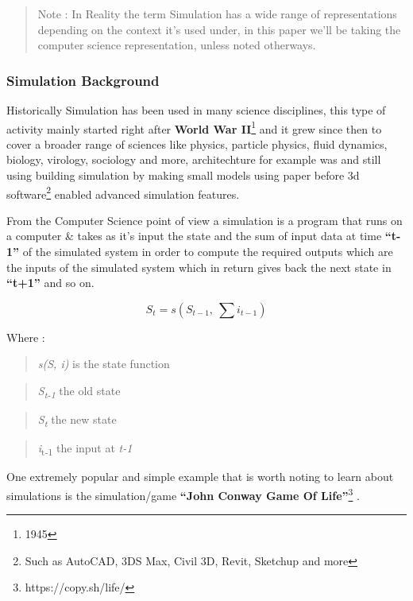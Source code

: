 \documentclass[
  14pt,
  english,
  a4paper,
]{scrreprt}
\begin{document}
\begin{quote}
Note : In Reality the term Simulation has a wide range of
representations depending on the context it's used under, in this paper
we'll be taking the computer science representation, unless noted
otherways.
\end{quote}

\hypertarget{simulation-background}{%
\subsubsection{Simulation Background}\label{simulation-background}}

Historically Simulation has been used in many science disciplines, this
type of activity mainly started right after \textbf{World War
II}\footnote{1945} and it grew since then to cover a broader range of
sciences like physics, particle physics, fluid dynamics, biology,
virology, sociology and more, architechture for example was and still
using building simulation by making small models using paper before 3d
software\footnote{Such as AutoCAD, 3DS Max, Civil 3D, Revit, Sketchup
  and more} enabled advanced simulation features.

From the Computer Science point of view a simulation is a program that
runs on a computer \& takes as it's input the state and the sum of input
data at time \textbf{``t-1''} of the simulated system in order to
compute the required outputs which are the inputs of the simulated
system which in return gives back the next state in \textbf{``t+1''} and
so on.

\[S_t=s(S_{t-1},\ \sum{i_{t-1}})\]

Where :

\begin{quote}
\emph{s(S, i)} is the state function
\end{quote}

\begin{quote}
\emph{S\textsubscript{t-1}} the old state
\end{quote}

\begin{quote}
\emph{S\textsubscript{t}} the new state
\end{quote}

\begin{quote}
\emph{i}\textsubscript{t-1} the input at \emph{t-1}
\end{quote}

One extremely popular and simple example that is worth noting to learn
about simulations is the simulation/game \textbf{``John Conway Game Of
Life''}\footnote{https://copy.sh/life/} .
\end{document}
